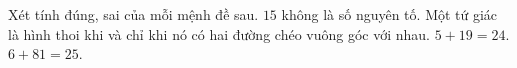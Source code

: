 \begin{ex}
Xét tính đúng, sai của mỗi mệnh đề sau.
\choiceTF
{\True $15$ không là số nguyên tố.}
{Một tứ giác là hình thoi khi và chỉ khi nó có hai đường chéo vuông góc với nhau.}
{\True $5+19=24$.}
{$6+81=25$.}
\end{ex}
